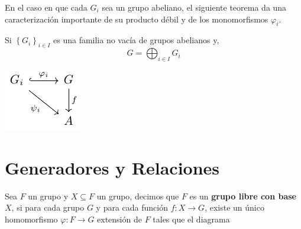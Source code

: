 \documentclass[12pt]{report}
\theoremstyle{largebreak}
\newcommand\cf[3]{\ensuremath{#1:#2\rightarrow#3}}
\begin{document}
    En el caso en que cada $G_i$ sea un grupo abeliano, el siguiente teorema da una caracterización importante de su producto débil y de los monomorfismos $\varphi_i$.

    \begin{theor}
        Si $\left\{G_i \right\}_{ i\in I}$ es una familia no vacía de grupos abelianos y,
        \begin{equation*}
            G=\bigoplus_{ i\in I}G_i
        \end{equation*}
        
        \begin{center}
            \includegraphics[scale=1.5]{images/fig_1.pdf}
        \end{center}
    \end{theor}

    \section{Generadores y Relaciones}

    \begin{mydef}
        Sea $F$ un grupo y $X\subseteq F$ un grupo, decimos que $F$ es un \textbf{grupo libre con base $X$}, si para cada grupo $G$ y para cada función $\cf{f}{X}{G}$, existe un único homomorfismo $\cf{\varphi}{F}{G}$ extensión de $F$ tales que el diagrama
        
    \end{mydef}
\end{document}

